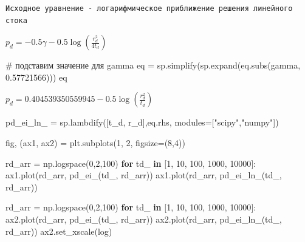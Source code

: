 \documentclass[
  russian,
  letterpaper,
  DIV=11,
  numbers=noendperiod,
  oneside]{scrartcl}
\newenvironment{Shaded}{\begin{snugshade}}{\end{snugshade}}
\newcommand{\CommentTok}[1]{\textcolor[rgb]{0.37,0.37,0.37}{#1}}
\newcommand{\ControlFlowTok}[1]{\textcolor[rgb]{0.00,0.23,0.31}{\textbf{#1}}}
\newcommand{\DecValTok}[1]{\textcolor[rgb]{0.68,0.00,0.00}{#1}}
\newcommand{\FloatTok}[1]{\textcolor[rgb]{0.68,0.00,0.00}{#1}}
\newcommand{\KeywordTok}[1]{\textcolor[rgb]{0.00,0.23,0.31}{\textbf{#1}}}
\newcommand{\NormalTok}[1]{\textcolor[rgb]{0.00,0.23,0.31}{#1}}
\newcommand{\OperatorTok}[1]{\textcolor[rgb]{0.37,0.37,0.37}{#1}}
\newcommand{\StringTok}[1]{\textcolor[rgb]{0.13,0.47,0.30}{#1}}
\begin{document}
\begin{verbatim}
Исходное уравнение - логарифмическое приближение решения линейного стока
\end{verbatim}

$\displaystyle p_{d} = - 0.5 \gamma - 0.5 \log{\left(\frac{r_{d}^{2}}{4 t_{d}} \right)}$

\begin{Shaded}
\begin{Highlighting}[]
\CommentTok{\# подставим значение для gamma}
\NormalTok{eq }\OperatorTok{=}\NormalTok{ sp.simplify(sp.expand(eq.subs(gamma, }\FloatTok{0.57721566}\NormalTok{)))}
\NormalTok{eq}
\end{Highlighting}
\end{Shaded}

$\displaystyle p_{d} = 0.404539350559945 - 0.5 \log{\left(\frac{r_{d}^{2}}{t_{d}} \right)}$

\begin{Shaded}
\begin{Highlighting}[]
\NormalTok{pd\_ei\_ln\_ }\OperatorTok{=}\NormalTok{ sp.lambdify([t\_d, r\_d],eq.rhs, modules}\OperatorTok{=}\NormalTok{[}\StringTok{"scipy"}\NormalTok{,}\StringTok{"numpy"}\NormalTok{]) }
\end{Highlighting}
\end{Shaded}

\begin{Shaded}
\begin{Highlighting}[]
\NormalTok{fig, (ax1, ax2) }\OperatorTok{=}\NormalTok{ plt.subplots(}\DecValTok{1}\NormalTok{, }\DecValTok{2}\NormalTok{, figsize}\OperatorTok{=}\NormalTok{(}\DecValTok{8}\NormalTok{,}\DecValTok{4}\NormalTok{))}

\NormalTok{rd\_arr }\OperatorTok{=}\NormalTok{ np.logspace(}\DecValTok{0}\NormalTok{,}\DecValTok{2}\NormalTok{,}\DecValTok{100}\NormalTok{)}
\ControlFlowTok{for}\NormalTok{ td\_ }\KeywordTok{in}\NormalTok{ [}\DecValTok{1}\NormalTok{, }\DecValTok{10}\NormalTok{, }\DecValTok{100}\NormalTok{, }\DecValTok{1000}\NormalTok{, }\DecValTok{10000}\NormalTok{]:}
\NormalTok{    ax1.plot(rd\_arr, pd\_ei\_(td\_, rd\_arr))}
\NormalTok{    ax1.plot(rd\_arr, pd\_ei\_ln\_(td\_, rd\_arr))}

\NormalTok{rd\_arr }\OperatorTok{=}\NormalTok{ np.logspace(}\DecValTok{0}\NormalTok{,}\DecValTok{2}\NormalTok{,}\DecValTok{100}\NormalTok{)}
\ControlFlowTok{for}\NormalTok{ td\_ }\KeywordTok{in}\NormalTok{ [}\DecValTok{1}\NormalTok{, }\DecValTok{10}\NormalTok{, }\DecValTok{100}\NormalTok{, }\DecValTok{1000}\NormalTok{, }\DecValTok{10000}\NormalTok{]:}
\NormalTok{    ax2.plot(rd\_arr, pd\_ei\_(td\_, rd\_arr))}
\NormalTok{    ax2.plot(rd\_arr, pd\_ei\_ln\_(td\_, rd\_arr))}
\NormalTok{ax2.set\_xscale(}\StringTok{\textquotesingle{}log\textquotesingle{}}\NormalTok{)}
\end{Highlighting}
\end{Shaded}
\end{document}
